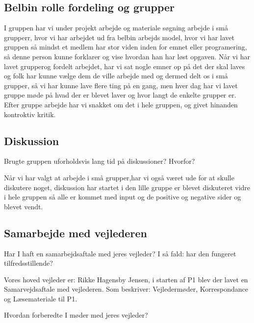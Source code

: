 \documentclass[a4paper,12pt,twoside,openright]{memoir}
\begin{document}
            \subsection{Belbin rolle fordeling og grupper}

I gruppen har vi under projekt arbejde og materiale søgning arbejde i små grupperr, hvor vi har arbejdet ud fra belbin arbejds model, hvor vi har lavet  gruppen så mindst et medlem har stor viden inden for emnet eller programering, så denne person kunne forklarer og vise hvordan han har løst opgaven. Når vi har lavet grupperog fordelt arbejdet, har vi sat nogle emner op på det der skal laves og folk har kunne vælge dem de ville arbejde med og dermed delt os i små grupper, så vi har kunne lave flere ting på en gang, men hver dag har vi lavet gruppe møde på hvad der er blevet laver  og hvor langt de enkelte grupper er. Efter gruppe arbejde har vi snakket  om det i hele  gruppen, og givet  hinanden kontroktiv kritik.\newline
         
            \subsection{Diskussion}

Brugte gruppen uforholdsvis lang tid på diskussioner? Hvorfor?\newline

Når vi har valgt at arbejde i små grupper,har vi også været ude for at skulle diskutere noget, diskussion har startet i den lille gruppe er blevet diskuteret vidre i hele gruppen så alle er kommet med input og de positive og negative sider og blevet vendt.\newline

            \subsection{Samarbejde med vejlederen}

Har I haft en samarbejdsaftale med jeres vejleder? I så fald: har den fungeret tilfredsstillende?\newline

Vores hoved vejleder er: Rikke Hagensby Jensen, i starten af P1 blev der lavet en Samarvejdsaftale med vejlederen. Som beskriver: Vejledermøder, Korrespondance og Læsemateriale til P1.\newline

Hvordan forberedte I møder med jeres vejleder?\newline
\end{document}
